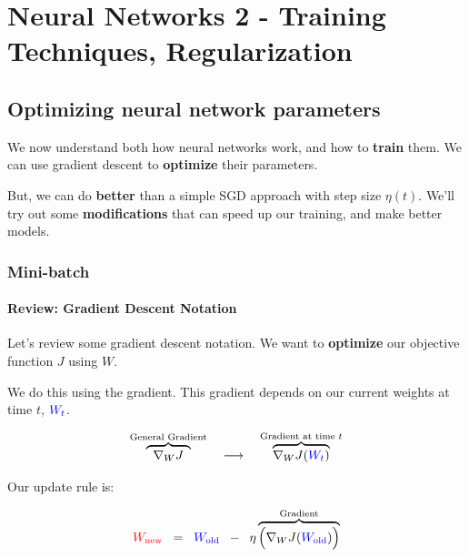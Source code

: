 \setcounter{chapter}{7-1}

\chapter{Neural Networks 2 - Training Techniques, Regularization}

\setcounter{section}{6}

\section{Optimizing neural network parameters}

    We now understand both how neural networks work, and how to \textbf{train} them. We can use gradient descent to \textbf{optimize} their parameters.
    
    But, we can do \textbf{better} than a simple SGD approach with step size $\eta(t)$. We'll try out some \textbf{modifications} that can speed up our training, and make better models.

    \pagebreak
    \subsection{Mini-batch}
    
        \subsubsection{Review: Gradient Descent Notation}
        
            Let's review some gradient descent notation. We want to \textbf{optimize} our objective function $J$ using $W$.
            
            We do this using the gradient. This gradient depends on our current weights at time $t$, $\textcolor{blue}{W_{t}}$.
            
            \begin{equation}
                \overbrace{
                    \;\;
                    \nabla_W J
                    \;\;
                }^{\text{General Gradient}}
                \quad
                \longrightarrow
                \quad
                \overbrace{
                    \nabla_W J ( \textcolor{blue}{ W_{t} } )
                }^{\text{Gradient at time $t$}}
            \end{equation}
            
            Our update rule is:
            
            \begin{equation}
                \textcolor{red}{ W_{\text{new}} }
                \;\;=\;\;
                \textcolor{blue}{ W_{\text{old}} }
                \;\;-\;\;
                \eta
                \overbrace{
                    \Big(
                        \nabla_W J ( \textcolor{blue}{ W_{\text{old}} } )
                    \Big)
                }^{\text{Gradient}} 
            \end{equation}
            
